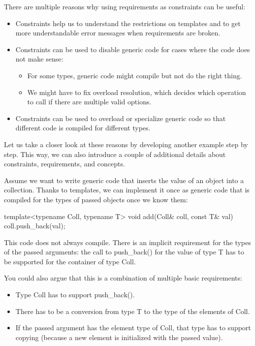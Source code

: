 

There are multiple reasons why using requirements as constraints can be useful:

\begin{itemize}
\item
Constraints help us to understand the restrictions on templates and to get more understandable error messages when requirements are broken.

\item
Constraints can be used to disable generic code for cases where the code does not make sense:
\begin{itemize}
\item
For some types, generic code might compile but not do the right thing.

\item
We might have to fix overload resolution, which decides which operation to call if there are multiple valid options.
\end{itemize}

\item
Constraints can be used to overload or specialize generic code so that different code is compiled for different types.
\end{itemize}

Let us take a closer look at these reasons by developing another example step by step. This way, we can also introduce a couple of additional details about constraints, requirements, and concepts.


Assume we want to write generic code that inserts the value of an object into a collection. Thanks to templates, we can implement it once as generic code that is compiled for the types of passed objects once we know them:

\begin{cpp}
template<typename Coll, typename T>
void add(Coll& coll, const T& val)
{
	coll.push_back(val);
}
\end{cpp}

This code does not always compile. There is an implicit requirement for the types of the passed arguments: the call to push\_back() for the value of type T has to be supported for the container of type Coll.

You could also argue that this is a combination of multiple basic requirements:

\begin{itemize}
\item
Type Coll has to support push\_back().

\item
There has to be a conversion from type T to the type of the elements of Coll.

\item
If the passed argument has the element type of Coll, that type has to support copying (because a new element is initialized with the passed value).
\end{itemize}

